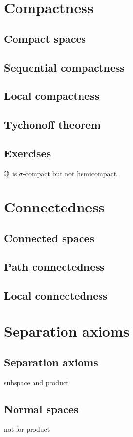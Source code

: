 \documentclass{../../large}
\begin{document}
\chapter{Compactness}
\section{Compact spaces}
\section{Sequential compactness}
\section{Local compactness}
\section{Tychonoff theorem}
\section*{Exercises}
\begin{prb}
$\mathbb{Q}$ is $\sigma$-compact but not hemicompact.
\end{prb}
\chapter{Connectedness}
\section{Connected spaces}
\section{Path connectedness}
\section{Local connectedness}



\chapter{Separation axioms}
\section{Separation axioms}
subspace and product


\section{Normal spaces}
not for product
\end{document}
